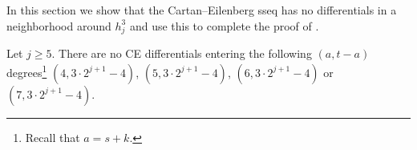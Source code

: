 
In this section we show that the Cartan--Eilenberg sseq has no differentials in a neighborhood around $h_j^3$ and use this to complete the proof of .


\begin{lem} \label{lem:entering g}
  Let $j \geq 5$.
  There are no CE differentials entering the following $(a,t-a)$ degrees\footnote{Recall that $a=s+k$.}
  $(4, 3 \cdot 2^{j+1}-4)$, $(5, 3 \cdot 2^{j+1}-4)$, $(6, 3 \cdot 2^{j+1}-4)$ or $(7, 3 \cdot 2^{j+1}-4)$.
\end{lem}

